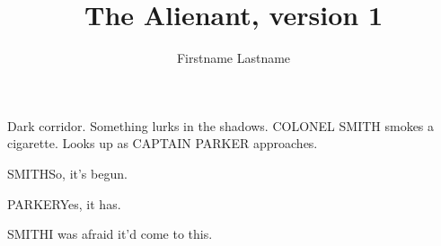 \documentclass{screenplay}
\title{The Alienant, version 1}
\author{Firstname Lastname}
\begin{document}
\coverpage
\fadein
{}
Dark corridor. Something lurks in the shadows.
COLONEL SMITH smokes a cigarette. Looks up as CAPTAIN PARKER approaches.
\begin{dialogue}{SMITH}So, it's begun.\end{dialogue}
\begin{dialogue}{PARKER}Yes, it has.\end{dialogue}
\begin{dialogue}{SMITH}I was afraid it'd come to this.\end{dialogue}
\theend
\end{document}
